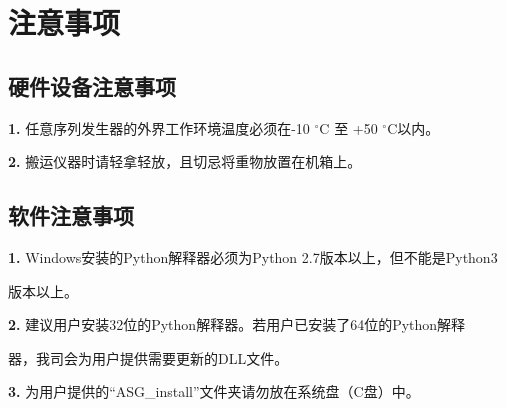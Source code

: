 \chapter{\heiti 注意事项}
\section{\heiti 硬件设备注意事项}
\noindent \textbf{1.} 任意序列发生器的外界工作环境温度必须在-10 $^{\circ}$C 至 +50 $^{\circ}$C以内。

\noindent \textbf{2.} 搬运仪器时请轻拿轻放，且切忌将重物放置在机箱上。

\section{\heiti 软件注意事项}
\noindent \textbf{1.} Windows安装的Python解释器必须为Python 2.7版本以上，但不能是Python3

\hspace{-1em}版本以上。

\noindent \textbf{2.} 建议用户安装32位的Python解释器。若用户已安装了64位的Python解释

\hspace{-1em}器，我司会为用户提供需要更新的DLL文件。

\noindent \textbf{3.} 为用户提供的“ASG\_install”文件夹请勿放在系统盘（C盘）中。
%


